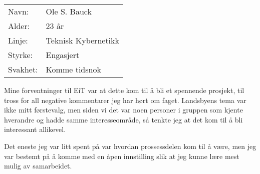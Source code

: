 \begin{table}[H]
\begin{tabular}{l l}
        Navn: & Ole S. Bauck \\
        Alder: & 23 år \\ 
        Linje: & Teknisk Kybernetikk \\
        Styrke: & Engasjert\\
        Svakhet: & Komme tidsnok
    \end{tabular}
\end{table}

Mine forventninger til EiT var at dette kom til å bli et spennende prosjekt, til tross for all negative kommentarer jeg har hørt om faget. 
Landsbyens tema var ikke mitt førstevalg, men siden vi det var noen personer i gruppen som kjente hverandre og hadde samme interesseområde, så tenkte jeg at det kom til å bli interessant allikevel.

Det eneste jeg var litt spent på var hvordan prossessdelen kom til å være, men jeg var bestemt på å komme med en åpen innstilling slik at jeg kunne lære mest mulig av samarbeidet.
